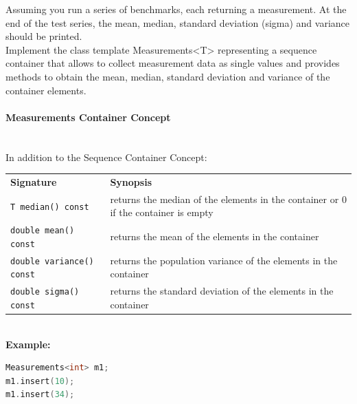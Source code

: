 \begin{homeworkProblem}
Assuming you run a series of benchmarks, each returning a measurement. At the end of the test series, the mean, median, standard deviation (sigma) and variance should be printed.\\
Implement the class template Measurements<T> representing a sequence container that allows to collect measurement data as single values and provides methods to obtain the mean, median, standard deviation and variance of the container elements.
\paragraph{Measurements Container Concept}\\
In addition to the Sequence Container Concept:
    \begin{table}[http]
        \label{tab:table3}
        \begin{tabularx}{\textwidth}{lX}
          \textbf {Signature} & \textbf{Synopsis} \\
          \texttt{T median()             const}    & returns the median of the elements in the container or $0$ if the container is empty \\
          \texttt{double mean()          const}    & returns the mean of the elements in the container \\
          \texttt{double variance()      const}    & returns the population variance of the elements in the container\\
          \texttt{double sigma()         const}    & returns the standard deviation of the elements in the container
        \end{tabularx}
    \end{table}\\\newpage
\textbf{Example:}
\begin{lstlisting}[language=C++]
Measurements<int> m1;
m1.insert(10);
m1.insert(34);


\end{lstlisting}
\end{homeworkProblem}
